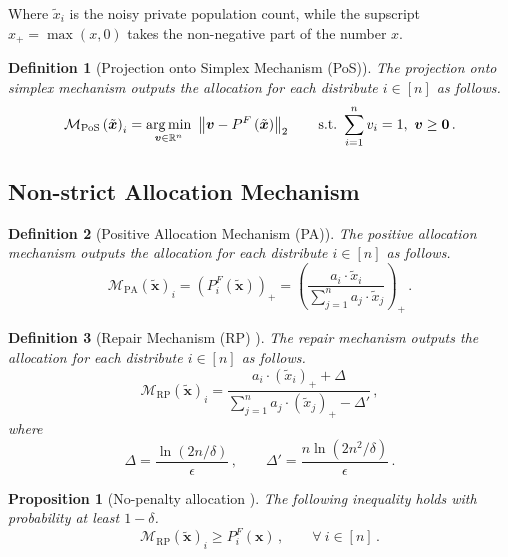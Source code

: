 \documentclass[9pt,lineno,twocolumn,twoside]{pnas-new}
\newtheorem{definition}{Definition}
\newcommand{\cM}{\mathcal{M}}
\newcommand{\truedata}{\bm{x}}
\newcommand{\noisyalloc}{\alloc{\noisydata}}
\newcommand{\noisydata}{\tilde{\bm{x}}}
\newcommand{\norm}[1]{\left\lVert#1\right\rVert}
\newtheorem{proposition}{Proposition}
\newcommand{\relu}[1]{\left(#1\right)_+}
\newcommand{\alloc}[1]{P^F\left(#1\right)}
\newcommand{\posmech}[1]{\cM_{\mathrm{PoS}}\left(#1\right)}
\newcommand{\pamech}[1]{\cM_{\mathrm{PA}}\left(#1\right)}
\newcommand{\rpmech}[1]{\cM_{\mathrm{RP}}\left(#1\right)}
\newcommand{\talloci}[1]{P^F_{#1}\left(\truedata\right)}
\newcommand{\nalloci}[1]{P^F_{#1}\left(\noisydata\right)}
\begin{document}
    Where $\tilde{x}_i$ is the noisy private population count, while the supscript $x_{+} = \max(x, 0)$ takes the non-negative part of the number $x$.


    \begin{definition}
        [Projection onto Simplex Mechanism (PoS)]
        The \emph{projection onto simplex mechanism} outputs the allocation for each distribute $i\in [n]$ as follows.
        \begin{equation*}
            \posmech{\noisydata}_i = \underset{\bm{v}\in\RR^n}{\arg\min}~\norm{\bm{v}-\noisyalloc}_2\qquad\mathrm{s.t.}~
            \sum_{i=1}^n v_i = 1,~\bm{v}\geq \bm{0}\,.
        \end{equation*}
    \end{definition}

    \subsection*{Non-strict Allocation Mechanism}
    \begin{definition}
        [Positive Allocation Mechanism (PA)]
        The \emph{positive allocation mechanism}
        outputs the allocation for each distribute $i\in [n]$ as follows.
        \begin{equation*}
            \pamech{\noisydata}_i  =  \relu{\nalloci{i}}= \relu{\frac{a_i\cdot \tilde{x}_i}{\sum_{j=1}^n a_j\cdot \tilde{x}_j}}\,.
        \end{equation*}
    \end{definition}
    \begin{definition}
        [Repair Mechanism (RP) \cite{pujol:20}]
        The \emph{repair mechanism} outputs the allocation for each distribute $i\in [n]$ as follows.
        \begin{equation*}
            \rpmech{\noisydata}_i  = \frac{a_i\cdot \relu{\tilde{x}_i}+\Delta}{\sum_{j=1}^n a_j\cdot \relu{\tilde{x}_j} - \Delta'}\,,
        \end{equation*}
        where
        \begin{equation*}
            \Delta= \frac{\ln\left(2n/\delta\right)}{\epsilon}\,,\qquad\Delta' =
            \frac{n\ln\left(2n^2/\delta\right)}{\epsilon}\,.
        \end{equation*}
    \end{definition}

    \begin{proposition}
        [No-penalty allocation \cite{pujol:20}]
        The following inequality holds with probability at least $1-\delta$.
        \begin{equation*}
            \rpmech{\noisydata}_i\geq \talloci{i}\,,\qquad\forall~i\in[n]\,.
        \end{equation*}
    \end{proposition}
\end{document}
